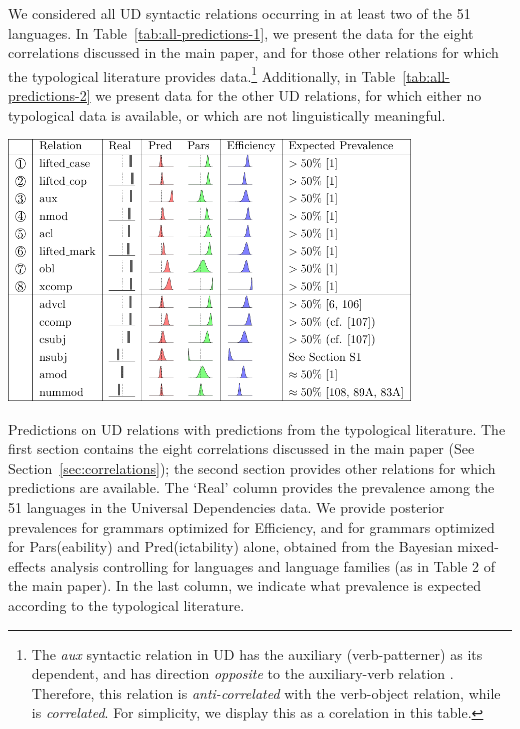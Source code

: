 \documentclass[10pt,twoside,lineno]{article}
\begin{document}
We considered all UD syntactic relations occurring in at least two of the 51 languages.
In Table~\ref{tab:all-predictions-1}, we present the data for the eight correlations discussed in the main paper, and for those other relations for which the typological literature provides data.\footnote{The \emph{aux} syntactic relation in UD has the auxiliary (verb-patterner) as its dependent, and has direction \emph{opposite} to the auxiliary-verb relation . Therefore, this relation is \emph{anti-correlated} with the verb-object relation, while  is \emph{correlated}.  For simplicity, we display this as a corelation in this table.}
Additionally, in Table~\ref{tab:all-predictions-2} we present data for the other UD relations, for which either no typological data is available, or which are not linguistically meaningful.





\begin{table} 
	\begin{center}	
\includegraphics[width=0.8\textwidth]{si-table-perrel-1a-1.png}
\end{center}
\caption{Predictions on UD relations with predictions from the typological literature.
The first section contains the eight correlations discussed in the main paper (See Section~\ref{sec:correlations}); the second section provides other relations for which predictions are available.
The `Real' column provides the prevalence among the 51 languages in the Universal Dependencies data.
We provide posterior prevalences for grammars optimized for Efficiency, and for grammars optimized for Pars(eability) and Pred(ictability) alone, obtained from the Bayesian mixed-effects analysis controlling for languages and language families (as in Table 2 of the main paper).
In the last column, we indicate what prevalence is expected according to the typological literature. 
}
\label{tab:all-predictions-1}
\end{table}
\end{document}
